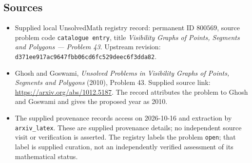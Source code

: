 \documentclass[11pt]{article}
\begin{document}
\subsection{Sources}
\begin{itemize}
\item Supplied local UnsolvedMath registry record: permanent ID \(800569\), source problem code \texttt{catalogue entry}, title \emph{Visibility Graphs of Points, Segments and Polygons --- Problem 43}. Upstream revision: \texttt{d371ee917ac9647fbb06cd6fc529deec6f3dda82}.
\item Ghosh and Goswami, \emph{Unsolved Problems in Visibility Graphs of Points, Segments and Polygons} (2010), Problem 43. Supplied source link: \url{https://arxiv.org/abs/1012.5187}. The record attributes the problem to Ghosh and Goswami and gives the proposed year as 2010.
\item The supplied provenance records access on 2026-10-16 and extraction by \texttt{arxiv\_latex}. These are supplied provenance details; no independent source visit or verification is asserted. The registry labels the problem \texttt{open}; that label is supplied curation, not an independently verified assessment of its mathematical status.
\end{itemize}
\end{document}
